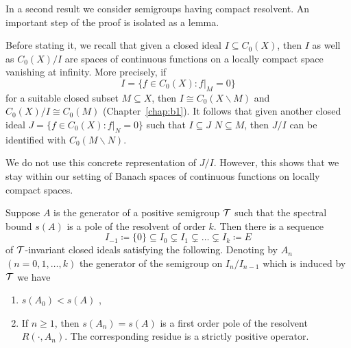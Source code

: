 In a second result we consider semigroups having compact resolvent.
An important step of the proof is isolated as a lemma.

Before stating it, we recall that given a closed ideal $I \subseteq C_{0}(X)$, then $I$ as well as $C_{0}(X)/I$ are spaces of continuous functions on a locally compact space vanishing at infinity.
More precisely, if 
\[
I = \{f \in C_{0}(X) \colon f|_{M} = 0\}
\]
for a suitable closed subset $M \subseteq X$, then $I \cong C_{0}(X\backslash M)$ and $C_{0}(X)/I \cong C_{0}(M)$ (\cf Chapter~\ref{chap:b1}).
It follows that given another closed ideal $J = \{f \in C_{0}(X) \colon f|_{N} = 0\}$ such that $I \subseteq J$ \ie $N \subseteq M$, then $J/I$ can be identified with $C_{0}(M\backslash N)$.

We do not use this concrete representation of\/ $J/I$.
However, this shows that we stay within our setting of Banach spaces of continuous functions on locally compact spaces.
\begin{lemma}\label{lem:b3-2.8}
Suppose $A$ is the generator of a positive semigroup $\mathcal{T}$ such that the spectral bound $s(A)$ is a pole of the resolvent%
of order $k$.
Then there is a sequence
\begin{equation}\label{eq:b3-2.16}
    I_{-1} \coloneq \{0\} \subseteq I_{0} \subsetneq I_{1} \subsetneq \ldots \subsetneq I_{k} \coloneq E
\end{equation}
of\/ $\mathcal{T}$-invariant closed ideals satisfying the following. 
Denoting by $A_{n}$ $(n = 0,1,\ldots,k)$ the generator of the semigroup on $I_{n}/I_{n-1}$ which is induced by $\mathcal{T}$ we have
\begin{enumerate}[\upshape (i)]
    \item 
    $s(A_{0}) < s(A)$ , 
    
    \item 
    If\/ $n \geq 1$, then $s(A_{n}) = s(A)$ is a first order pole of the resolvent $R(\cdot,A_{n})$. 
    The corresponding residue is a strictly positive operator.
\end{enumerate}
\end{lemma}
